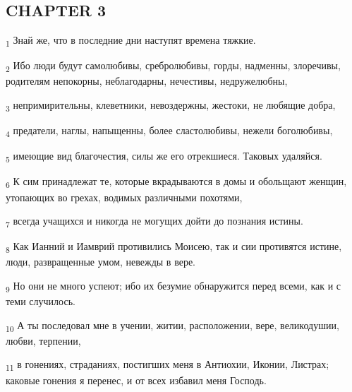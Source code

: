 \subsection{CHAPTER 3}
\begin{tcolorbox}
\textsubscript{1} Знай же, что в последние дни наступят времена тяжкие.
\end{tcolorbox}
\begin{tcolorbox}
\textsubscript{2} Ибо люди будут самолюбивы, сребролюбивы, горды, надменны, злоречивы, родителям непокорны, неблагодарны, нечестивы, недружелюбны,
\end{tcolorbox}
\begin{tcolorbox}
\textsubscript{3} непримирительны, клеветники, невоздержны, жестоки, не любящие добра,
\end{tcolorbox}
\begin{tcolorbox}
\textsubscript{4} предатели, наглы, напыщенны, более сластолюбивы, нежели боголюбивы,
\end{tcolorbox}
\begin{tcolorbox}
\textsubscript{5} имеющие вид благочестия, силы же его отрекшиеся. Таковых удаляйся.
\end{tcolorbox}
\begin{tcolorbox}
\textsubscript{6} К сим принадлежат те, которые вкрадываются в домы и обольщают женщин, утопающих во грехах, водимых различными похотями,
\end{tcolorbox}
\begin{tcolorbox}
\textsubscript{7} всегда учащихся и никогда не могущих дойти до познания истины.
\end{tcolorbox}
\begin{tcolorbox}
\textsubscript{8} Как Ианний и Иамврий противились Моисею, так и сии противятся истине, люди, развращенные умом, невежды в вере.
\end{tcolorbox}
\begin{tcolorbox}
\textsubscript{9} Но они не много успеют; ибо их безумие обнаружится перед всеми, как и с теми случилось.
\end{tcolorbox}
\begin{tcolorbox}
\textsubscript{10} А ты последовал мне в учении, житии, расположении, вере, великодушии, любви, терпении,
\end{tcolorbox}
\begin{tcolorbox}
\textsubscript{11} в гонениях, страданиях, постигших меня в Антиохии, Иконии, Листрах; каковые гонения я перенес, и от всех избавил меня Господь.
\end{tcolorbox}
